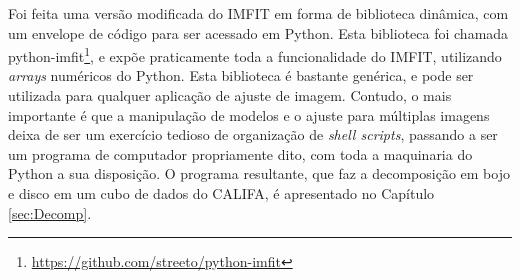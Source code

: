 Foi feita uma versão modificada do IMFIT em forma de biblioteca dinâmica, com um
envelope de código para ser acessado em Python. Esta biblioteca foi chamada
python-imfit\footnote{\url{https://github.com/streeto/python-imfit}}, e expõe
praticamente toda a funcionalidade do IMFIT, utilizando {\em arrays} numéricos
do Python. Esta biblioteca é bastante genérica, e pode ser utilizada para
qualquer aplicação de ajuste de imagem. Contudo, o mais importante é que a
manipulação de modelos e o ajuste para múltiplas imagens deixa de ser um
exercício tedioso de organização de {\em shell scripts}\fixme, passando a ser um
programa de computador propriamente dito, com toda a maquinaria do Python a sua
disposição. O programa resultante, que faz a decomposição em bojo e disco em um
cubo de dados do CALIFA, é apresentado no Capítulo \ref{sec:Decomp}.

